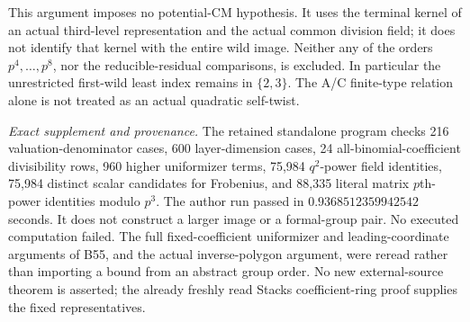 \begin{remark}
\label{rem:B-RD79-scope}
This argument imposes no potential-CM hypothesis. It uses the
terminal kernel of an actual third-level representation and
the actual common division field; it does not identify that
kernel with the entire wild image. Neither any of the orders
\(p^4,\ldots,p^8\), nor the reducible-residual comparisons, is
excluded. In particular the unrestricted first-wild least
index remains in \(\{2,3\}\). The A/C finite-type relation alone
is not treated as an actual quadratic self-twist.


\smallskip
\noindent\emph{Exact supplement and provenance.}
The retained standalone program
checks 216 valuation-denominator cases, 600 layer-dimension
cases, 24 all-binomial-coefficient divisibility rows, 960
higher uniformizer terms, 75,984 \(q^2\)-power field identities,
75,984 distinct scalar candidates for Frobenius, and 88,335
literal matrix \(p\)th-power identities modulo \(p^3\).
The author run passed in \(0.9368512359942542\) seconds.
It does not construct a larger image or a formal-group pair.
No executed computation failed. The full fixed-coefficient
uniformizer and leading-coordinate arguments of B55, and the
actual inverse-polygon argument, were reread rather than
importing a bound from an abstract group order. No new
external-source theorem is asserted; the already freshly read
Stacks coefficient-ring proof supplies the fixed representatives.
\end{remark}
